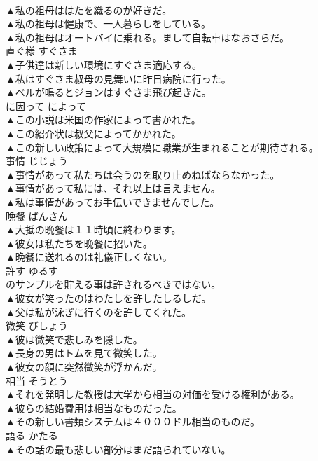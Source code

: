 \documentclass[8pt]{extreport}
\begin{document}
\begin{CJK}{UTF8}{min}
\\	▲私の祖母ははたを織るのが好きだ。 
\\	▲私の祖母は健康で、一人暮らしをしている。 
\\	▲私の祖母はオートバイに乗れる。まして自転車はなおさらだ。 
\\	直ぐ様	すぐさま	
\\	▲子供達は新しい環境にすぐさま適応する。 
\\	▲私はすぐさま叔母の見舞いに昨日病院に行った。 
\\	▲ベルが鳴るとジョンはすぐさま飛び起きた。 
\\	に因って	によって	
\\	▲この小説は米国の作家によって書かれた。 
\\	▲この紹介状は叔父によってかかれた。 
\\	▲この新しい政策によって大規模に職業が生まれることが期待される。 
\\	事情	じじょう	
\\	▲事情があって私たちは会うのを取り止めねばならなかった。 
\\	▲事情があって私には、それ以上は言えません。 
\\	▲私は事情があってお手伝いできませんでした。 
\\	晩餐	ばんさん	
\\	▲大抵の晩餐は１１時頃に終わります。 
\\	▲彼女は私たちを晩餐に招いた。 
\\	▲晩餐に送れるのは礼儀正しくない。 
\\	許す	ゆるす	
\\	のサンプルを貯える事は許されるべきではない。 
\\	▲彼女が笑ったのはわたしを許したしるしだ。 
\\	▲父は私が泳ぎに行くのを許してくれた。 
\\	微笑	びしょう	
\\	▲彼は微笑で悲しみを隠した。 
\\	▲長身の男はトムを見て微笑した。 
\\	▲彼女の顔に突然微笑が浮かんだ。 
\\	相当	そうとう	
\\	▲それを発明した教授は大学から相当の対価を受ける権利がある。 
\\	▲彼らの結婚費用は相当なものだった。 
\\	▲その新しい書類システムは４０００ドル相当のものだ。 
\\	語る	かたる	
\\	▲その話の最も悲しい部分はまだ語られていない。 

\end{CJK}
\end{document}
